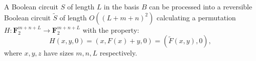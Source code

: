 A Boolean circuit $S$ of length $L$ in the basis $B$ can be processed into a reversible Boolean circuit $\tilde{S}$ of length $O((L+m+n)^2)$ calculating a permutation $H : \mathbf{F}_2^{m+n+L} \rightarrow \mathbf{F}_2^{m+n+L}$ with the property:
$$H(x,y,0) = (x,F(x)+y,0) = (\tilde{F}(x,y),0),$$
where $x,y,z$ have sizes $m,n,L$ respectively.
